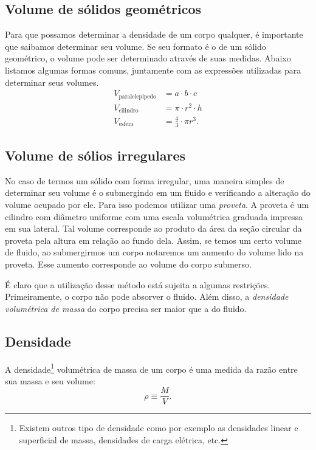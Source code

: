 \subsection{Volume de sólidos geométricos}

Para que possamos determinar a densidade de um corpo qualquer, é importante que saibamos determinar seu volume. Se seu formato é o de um sólido geométrico, o volume pode ser determinado através de suas medidas. Abaixo listamos algumas formas comuns, juntamente com as expressões utilizadas para determinar seus volumes.
\begin{align}
    V_{\text{paralelepípedo}} &= a \cdot b \cdot c \\
    V_{\text{cilindro}} &= \pi \cdot r^2 \cdot h \\
    V_{\text{esfera}} &= \frac{4}{3} \cdot \pi r^3.
\end{align}

\subsection{Volume de sólios irregulares}

No caso de termos um sólido com forma irregular, uma maneira simples de determinar seu volume é o submergindo em um fluido e verificando a alteração do volume ocupado por ele. Para isso podemos utilizar uma \emph{proveta}. A proveta é um cilindro com diâmetro uniforme com uma escala volumétrica graduada impressa em sua lateral. Tal volume corresponde ao produto da área da seção circular da proveta pela altura em relação ao fundo dela. Assim, se temos um certo volume de fluido, ao submergirmos um corpo notaremos um aumento do volume lido na proveta. Esse aumento corresponde ao volume do corpo submerso.

É claro que a utilização desse método está sujeita a algumas restrições. Primeiramente, o corpo não pode absorver o fluido. Além disso, a \emph{densidade volumétrica de massa} do corpo precisa ser maior que a do fluido.

\subsection{Densidade}

A densidade\footnote{Existem outros tipo de densidade como por exemplo as densidades linear e superficial de massa, densidades de carga elétrica, etc.} volumétrica de massa de um corpo é uma medida da razão entre sua massa e seu volume:
\begin{equation}
    \rho \equiv \frac{M}{V}.
\end{equation}

